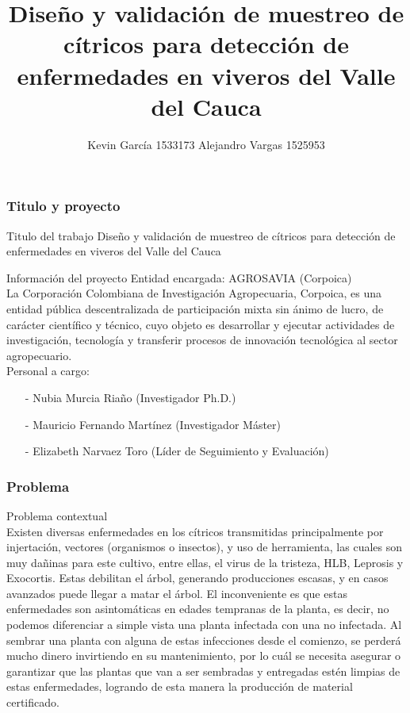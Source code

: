 \documentclass[10.5pt]{beamer}
\author[Kevin García - Alejandro Vargas]{Kevin García 1533173 \newline Alejandro Vargas 1525953}
\title[Anteproyecto]{Diseño y validación de muestreo de cítricos para detección de enfermedades en viveros del Valle del Cauca}
\begin{document}
\justify
\begin{frame}
\frametitle{Titulo y proyecto}
\begin{block}{Titulo del trabajo}
\justifying
Diseño y validación de muestreo de cítricos para detección de enfermedades en viveros del Valle del Cauca
\end{block}

\begin{block}{Información del proyecto}
\justifying
Entidad encargada: AGROSAVIA (Corpoica)
~\\La Corporación Colombiana de Investigación Agropecuaria, Corpoica, es una entidad pública descentralizada de participación mixta sin ánimo de lucro, de carácter científico y técnico, cuyo objeto es desarrollar y ejecutar actividades de investigación, tecnología y transferir procesos de innovación tecnológica al sector agropecuario.
~\\Personal a cargo:
\begin{itemize}
\item[-]Nubia Murcia Riaño (Investigador Ph.D.)
\item[-]Mauricio Fernando Martínez (Investigador Máster)
\item[-]Elizabeth Narvaez Toro (Líder de Seguimiento y Evaluación)
\end{itemize}
\end{block}
\end{frame}

\begin{frame}
\frametitle{Problema}
\begin{block}{Problema contextual}
\justifying
~\\Existen diversas enfermedades en los cítricos transmitidas principalmente por injertación, vectores (organismos o insectos), y uso de herramienta, las cuales son muy dañinas para este cultivo, entre ellas, el virus de la tristeza, HLB, Leprosis y Exocortis. Estas debilitan el árbol, generando producciones escasas, y en casos avanzados puede llegar a matar el árbol. El inconveniente es que estas enfermedades son asintomáticas en edades tempranas de la planta, es decir, no podemos diferenciar a simple vista una planta infectada con una no infectada. Al sembrar una planta con alguna de estas infecciones desde el comienzo, se perderá mucho dinero invirtiendo en su mantenimiento, por lo cuál se necesita asegurar o garantizar que las plantas que van a ser sembradas y entregadas estén limpias de estas enfermedades, logrando de esta manera la producción de material certificado.
\end{block}
\end{frame}
\end{document}
